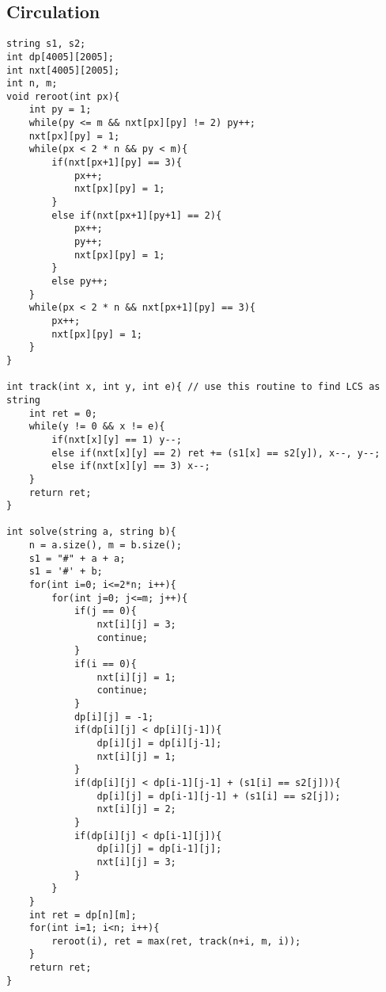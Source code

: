 \documentclass[landscape, 8pt, a4paper, oneside, twocolumn]{extarticle}
\begin{document}
\subsection{Circulation}
\begin{verbatim}
string s1, s2;
int dp[4005][2005];
int nxt[4005][2005];
int n, m;
void reroot(int px){
	int py = 1;
	while(py <= m && nxt[px][py] != 2) py++;
	nxt[px][py] = 1;
	while(px < 2 * n && py < m){
		if(nxt[px+1][py] == 3){
			px++;
			nxt[px][py] = 1;
		}
		else if(nxt[px+1][py+1] == 2){
			px++;
			py++;
			nxt[px][py] = 1;
		}
		else py++;
	}
	while(px < 2 * n && nxt[px+1][py] == 3){
		px++;
		nxt[px][py] = 1;
	}
}

int track(int x, int y, int e){ // use this routine to find LCS as string
	int ret = 0;
	while(y != 0 && x != e){
		if(nxt[x][y] == 1) y--;
		else if(nxt[x][y] == 2) ret += (s1[x] == s2[y]), x--, y--;
		else if(nxt[x][y] == 3) x--;
	}
	return ret;
}

int solve(string a, string b){
	n = a.size(), m = b.size();
	s1 = "#" + a + a;
	s1 = '#' + b;
	for(int i=0; i<=2*n; i++){
		for(int j=0; j<=m; j++){
			if(j == 0){
				nxt[i][j] = 3;
				continue;
			}
			if(i == 0){
				nxt[i][j] = 1;
				continue;
			}
			dp[i][j] = -1;
			if(dp[i][j] < dp[i][j-1]){
				dp[i][j] = dp[i][j-1];
				nxt[i][j] = 1;
			}
			if(dp[i][j] < dp[i-1][j-1] + (s1[i] == s2[j])){
				dp[i][j] = dp[i-1][j-1] + (s1[i] == s2[j]);
				nxt[i][j] = 2;
			}
			if(dp[i][j] < dp[i-1][j]){
				dp[i][j] = dp[i-1][j];
				nxt[i][j] = 3;
			}
		}
	}
	int ret = dp[n][m];
	for(int i=1; i<n; i++){
		reroot(i), ret = max(ret, track(n+i, m, i));
	}
	return ret;
}
\end{verbatim}
\end{document}
